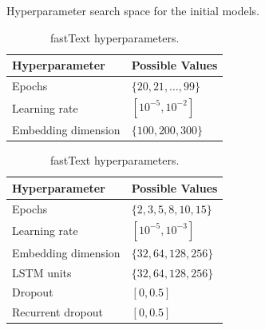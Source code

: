 \documentclass[conference]{IEEEtran}
\begin{document}


\begin{table}[H]
    \caption{Hyperparameter search space for the initial models.}
    \centering
    \label{tab:basemodel_hyp}
    \begin{subtable}[t]{0.45\textwidth}
        \centering
        \begin{tabular}{ll}
        \toprule
        \textbf{Hyperparameter} & \textbf{Possible Values} \\
        \midrule
        Epochs \phantom{abcng dimensi} & $\{20, 21, \ldots, 99\}$ \phantom{o}\\
        Learning rate           & $[10^{-5}, 10^{-2}]$ \\
        Embedding dimension     & $\{100, 200, 300\}$ \\
        \bottomrule
        \end{tabular}
        \vspace{.3em}
        \caption{fastText hyperparameters.}
        \label{parameters_basefasttext}
        \vspace{.1em}
    \end{subtable}
    \begin{subtable}[t]{0.45\textwidth}
        \centering
        \begin{tabular}{ll}
        \toprule
        \textbf{Hyperparameter} & \textbf{Possible Values} \\
        \midrule
        Epochs                  & $\{2, 3, 5, 8, 10, 15\}$ \\
        Learning rate           & $[10^{-5}, 10^{-3}]$ \\
        Embedding dimension     & $\{32, 64, 128, 256\}$ \\
        LSTM units              & $\{32, 64, 128, 256\}$ \\
        Dropout                 & $[0, 0.5]$ \\
        Recurrent dropout       & $[0, 0.5]$ \\
        \bottomrule
        \end{tabular}
        \vspace{.3em}

\end{subtable}
\end{table}
\end{document}
